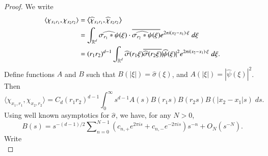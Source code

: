 
\begin{proof}
%
    We write
    \begin{equation}
    \begin{split}
        \langle \chi_{x_1 r_1}, \chi_{x_2 r_2} \rangle &= \left\langle \widehat{\chi}_{x_1 r_1}, \widehat{\chi}_{x_2 r_2} \right\rangle\\
        &= \int_{\operatorname{\mathbb{R}}^d} \widehat{\sigma_{r_1} * \psi}(\xi) \cdot \overline{\widehat{\sigma_{r_2} * \psi}(\xi)} e^{2 \pi i (x_2 - x_1) \cdot \xi}\; d\xi\\
        &= (r_1 r_2)^{d-1} \int_{\operatorname{\mathbb{R}}^d} \widehat{\sigma}(r_1 \xi) \overline{\widehat{\sigma}(r_2 \xi)} |\widehat{\psi}(\xi)|^2 e^{2 \pi i (x_2 - x_1) \cdot \xi}\; d\xi.
    \end{split}
    \end{equation}
    Define functions $A$ and $B$ such that $B(|\xi|) = \widehat{\sigma}(\xi)$, and $A(|\xi|) = |\widehat{\psi}(\xi)|^2$. Then
    \begin{equation}
      \langle \chi_{x_1, r_1}, \chi_{x_2, r_2} \rangle = C_d (r_1r_2)^{d-1} \int_0^\infty s^{d-1} A(s) B(r_1 s) B(r_2 s) B(|x_2 - x_1| s)\; ds.
    \end{equation}
    Using well known asymptotics for $\widehat{\sigma}$, we have, for any $N > 0$,
    \begin{equation}
      B(s) = s^{-(d-1)/2} \sum\nolimits_{n = 0}^{N-1} (c_{n,+} e^{2 \pi i s} + c_{n,-} e^{-2 \pi i s}) s^{-n} + O_N(s^{-N}).
    \end{equation}
    Write
    \begin{equation}

\end{equation}
\end{proof}
